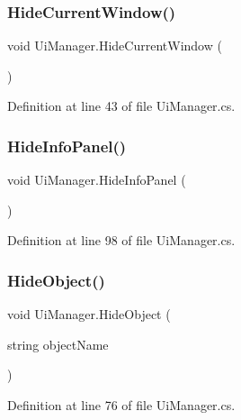 \subsubsection{\texorpdfstring{HideCurrentWindow()}{HideCurrentWindow()}}
{\footnotesize\ttfamily void Ui\+Manager.\+Hide\+Current\+Window (\begin{DoxyParamCaption}{ }\end{DoxyParamCaption})}



Definition at line 43 of file Ui\+Manager.\+cs.

\mbox{\label{class_ui_manager_ad25d66056dc6d01b980834273ed41858}} 
\subsubsection{\texorpdfstring{HideInfoPanel()}{HideInfoPanel()}}
{\footnotesize\ttfamily void Ui\+Manager.\+Hide\+Info\+Panel (\begin{DoxyParamCaption}{ }\end{DoxyParamCaption})}



Definition at line 98 of file Ui\+Manager.\+cs.

\mbox{\label{class_ui_manager_a1cb78e3a47e10b031ce57afb314ca325}} 
\subsubsection{\texorpdfstring{HideObject()}{HideObject()}}
{\footnotesize\ttfamily void Ui\+Manager.\+Hide\+Object (\begin{DoxyParamCaption}\item[{string}]{object\+Name }\end{DoxyParamCaption})}



Definition at line 76 of file Ui\+Manager.\+cs.

\mbox{\label{class_ui_manager_a29bd6700b20d98d699f5fc7623460a3d}} 
